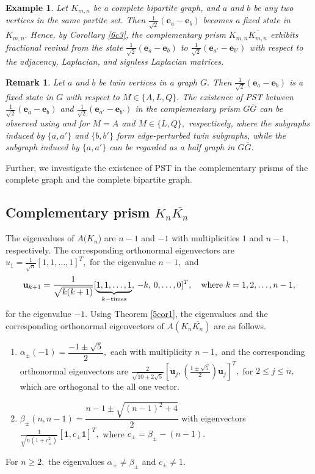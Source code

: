 \documentclass[12pt,a4paper]{article}
\newtheorem{exm}{Example}
\newtheorem{rem}{Remark}
\def \e {{\bf e}}
\def \u {{\bf u}}
\def \e {{\mathbf e}}
\newcommand{\ob}[1]{\left(#1\right)}
\newcommand{\tb}[1]{\left[#1\right]}
\begin{document}
\begin{exm}
  Let $K_{m,n}$ be a complete bipartite graph, and $a$ and $b$ be any two vertices in the same partite set. Then $\frac{1}{\sqrt{2}}(\e_a-\e_b)$ becomes a fixed state in $K_{m,n}.$ Hence, by Corollary \ref{6c3}, the complementary prism $K_{m,n}\overline{K_{m,n}}$  exhibits fractional revival from the state $\frac{1}{\sqrt{2}}(\e_a-\e_b)$ to $\frac{1}{\sqrt{2}}(\e_{a'}-\e_{b'})$ with respect to the adjacency, Laplacian, and signless Laplacian matrices.
\end{exm}

\begin{rem}
   Let $a$ and $b$ be twin vertices in a graph $G.$ Then
$\frac{1}{\sqrt{2}}(\e_a-\e_b)$ is a fixed state in $G$ with respect to $M\in \{A,L,Q\}.$ The existence of PST between $
\frac{1}{\sqrt{2}}(\e_a-\e_b)$
and $\frac{1}{\sqrt{2}}(\e_{a'}-\e_{b'})$ in the complementary prism $G\overline{G}$
can be observed using \cite[Corollary 4]{god8}  and \cite[Corollary 1(1(a))]{ojha1} for $M=A$ and $M\in\{L,Q\},$ respectively, where the subgraphs induced by $\{a,a'\}$ and $\{b,b'\}$ form edge-perturbed twin subgraphs, while the subgraph induced by $\{a,a'\}$ can be regarded as a half graph in $G\overline{G}.$  
 
\end{rem}

Further, we investigate the existence of PST in the complementary prisms of the complete graph and the complete bipartite graph. 
\subsection{Complementary prism $K_n\overline{K_n}$}
 The  eigenvalues of $A(K_n$) are $n-1$ and $-1$ with multiplicities $1$ and $n-1,$ respectively. The corresponding orthonormal eigenvectors are $u_1=\frac{1}{\sqrt{n}}\tb{1,1,\ldots,1}^T,$ for the eigenvalue $n-1,$ and 
 \[
\u_{k+1} = \frac{1}{\sqrt{k(k+1)}}[\underbrace{1,1,\dots,1}_{k-\text{times}},\,-k,\,0,\dots,0]^T, \quad\text{where $k=1,2,\ldots,n-1,$}\]
for the eigenvalue $-1.$
Using Theorem \ref{5cor1}, the eigenvalues and the corresponding orthonormal eigenvectors of $A\ob{K_n\overline{K_n}}$ are as follows.  
\begin{enumerate}[label=(\roman*)]
\item $\alpha_{\pm}(-1)=\dfrac{-1\pm\sqrt{5}}{2},$ each with multiplicity $n-1,$ and the corresponding orthonormal eigenvectors are $\frac{2}{\sqrt{10\pm2\sqrt{5}}}\tb{\mathbf{u}_j,
    \ob{\frac{1\pm\sqrt{5}}{2}}\mathbf{u}_j}^T,$ for $2\leq j\leq n,$ which are orthogonal to the all one vector.
 \item $\beta_{\pm}(n,n-1)=\dfrac{n-1\pm\sqrt{(n-1)^2+4}}{2}$ with eigenvectors $\frac{1}{\sqrt{{n\ob{1+ c_{\pm}^2}}}}[\mathbf{1},c_{\pm}\mathbf{1}]^T,$ where $c_{\pm}=\beta_{\pm}-(n-1).$ 
\end{enumerate}
For $n\geq 2,$ the eigenvalues $\alpha_{\pm}\neq \beta_{\pm}$ and $c_{\pm}\neq 1.$
\end{document}
